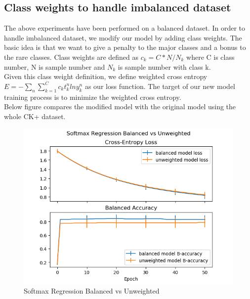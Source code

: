 \documentclass{article} %
\begin{document}
\subsection {Class weights to handle imbalanced dataset}
The above experiments have been performed on a balanced dataset. In order to handle imbalanced dataset, we modify our model by adding class weights. The basic idea is that we want to give a penalty to the major classes and a bonus to the rare classes. Class weights are defined as $c_k = C*N/N_k$ where C is class number, N is sample number and $N_k$ is sample number with class k. \\
Given this class weight definition, we define weighted cross entropy $E = -\sum_{n}\sum_{k=1}^{C} c_k t_k^n ln y_k^n $ as our loss function. The target of our new model training process is to minimize the weighted cross entropy. \\
Below figure compares the modified model with the original model using the whole CK+ dataset.
\begin{figure}[h]
	\centering
	\includegraphics[scale=0.5]{./graph/unbalanced.png}
	\caption{Softmax Regression Balanced vs Unweighted}
\end{figure}
\end{document}
